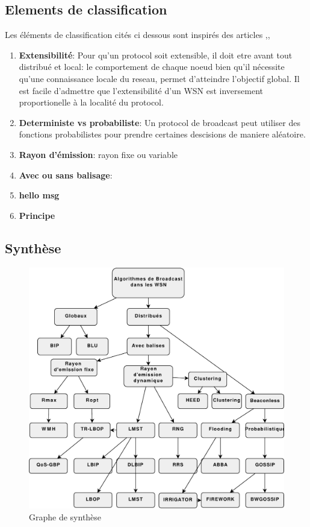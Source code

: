 \subsection{Elements de classification}
Les éléments de classification cités ci dessous sont inspirés des articles \cite{stojmenovic2004},\cite{ingelrest2005},\cite{wu2003}
\begin{enumerate}
 \item  \textbf{Extensibilité}: Pour qu'un protocol soit extensible, il doit etre avant tout distribué et local: le comportement de chaque noeud bien qu'il
nécessite qu'une connaissance locale du reseau, permet d'atteindre l'objectif global. Il est facile d'admettre que l'extensibilité d'un WSN est inversement proportionelle à la localité du protocol. 
 \item  \textbf{Deterministe vs probabiliste}: Un protocol de broadcast peut utiliser des fonctions probabilistes pour prendre certaines descisions de maniere aléatoire.
 \item  \textbf{Rayon d'émission}:  rayon fixe ou variable
 \item  \textbf{Avec ou sans balisage}:  
 \item  \textbf{hello msg}  
 \item  \textbf{Principe} 
\end{enumerate}



\subsection{Synthèse}

\begin{figure}[H]
\centering
\includegraphics[scale=0.8]{Etat_de_l'art/source/classification}
\caption{ Graphe de synthèse}
\end{figure} 






